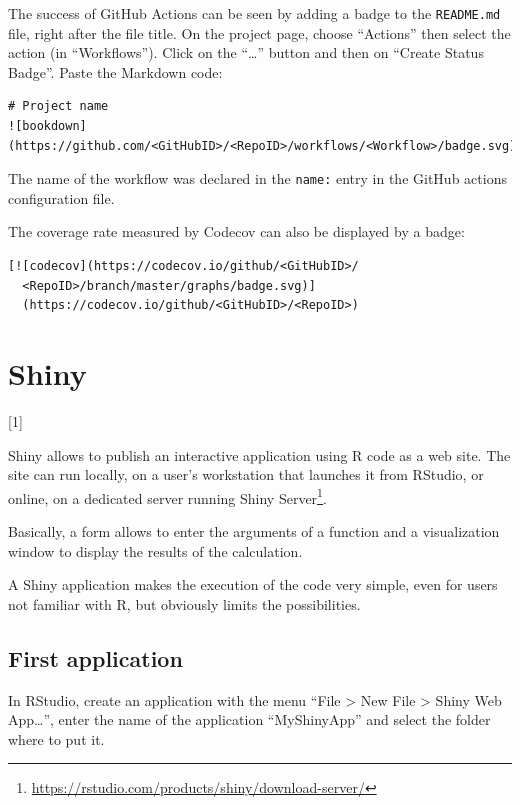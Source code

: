 \documentclass[
  12pt,
  american,
  a4paper,
  extrafontsizes,onecolumn,openright
  ]{memoir}
\newcommand{\toc}[1]{%
  \startcontents[chapters]%
  \printcontents[chapters]{}{1}[#1]{}%
  ~\newline%
}
\begin{document}
The success of GitHub Actions can be seen by adding a badge to the \texttt{README.md} file, right after the file title.
On the project page, choose \enquote{Actions} then select the action (in \enquote{Workflows}).
Click on the \enquote{\ldots{}} button and then on \enquote{Create Status Badge}.
Paste the Markdown code:

\begin{verbatim}
# Project name
![bookdown](https://github.com/<GitHubID>/<RepoID>/workflows/<Workflow>/badge.svg)
\end{verbatim}

The name of the workflow was declared in the \texttt{name:} entry in the GitHub actions configuration file.

The coverage rate measured by Codecov can also be displayed by a badge:

\begin{verbatim}
[![codecov](https://codecov.io/github/<GitHubID>/
  <RepoID>/branch/master/graphs/badge.svg)]
  (https://codecov.io/github/<GitHubID>/<RepoID>)
\end{verbatim}

\hypertarget{chap-shiny}{%
\chapter{Shiny}\label{chap-shiny}}

\toc{1}

Shiny allows to publish an interactive application using R code as a web site.
The site can run locally, on a user's workstation that launches it from RStudio, or online, on a dedicated server running Shiny Server\footnote{\url{https://rstudio.com/products/shiny/download-server/}}.

Basically, a form allows to enter the arguments of a function and a visualization window to display the results of the calculation.

A Shiny application makes the execution of the code very simple, even for users not familiar with R, but obviously limits the possibilities.

\hypertarget{first-application}{%
\section{First application}\label{first-application}}

In RStudio, create an application with the menu \enquote{File \textgreater{} New File \textgreater{} Shiny Web App\ldots{}}, enter the name of the application \enquote{MyShinyApp} and select the folder where to put it.
\end{document}
